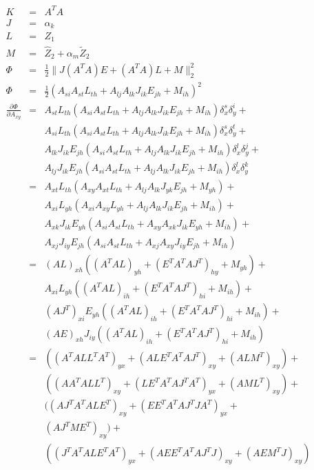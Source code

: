 \documentclass[9pt,twocolumn]{extarticle}
\begin{document}
\begin{eqnarray*}
  K &=& A^TA\\
  J &=& \alpha_k\\
  L &=& Z_1\\
  M &=& \hat{Z}_2+\alpha_m\tilde{Z}_2\\
  \Phi &=& \frac{1}{2}\| J(A^TA)E + (A^TA)L + M \|_2^2\\
  \Phi &=& \frac{1}{2}(A_{si}A_{st}L_{th}+A_{lj}A_{lk}J_{ik}E_{jh}+M_{ih})^2\\
  \frac{\partial{\Phi}}{\partial{A_{xy}}}
  &=&A_{st}L_{th}(A_{si}A_{st}L_{th}+A_{lj}A_{lk}J_{ik}E_{jh}+M_{ih})\delta_x^s\delta_y^i+\\
  &&A_{si}L_{th}(A_{si}A_{st}L_{th}+A_{lj}A_{lk}J_{ik}E_{jh}+M_{ih})\delta_x^s\delta_y^t+\\
  &&A_{lk}J_{ik}E_{jh}(A_{si}A_{st}L_{th}+A_{lj}A_{lk}J_{ik}E_{jh}+M_{ih})\delta_x^l\delta_y^j+\\
  &&A_{lj}J_{ik}E_{jh}(A_{si}A_{st}L_{th}+A_{lj}A_{lk}J_{ik}E_{jh}+M_{ih})\delta_x^l\delta_y^k\\
  &=&A_{xt}L_{th}(A_{xy}A_{xt}L_{th}+A_{lj}A_{lk}J_{yk}E_{jh}+M_{yh})+\\
  &&A_{xi}L_{yh}(A_{xi}A_{xy}L_{yh}+A_{lj}A_{lk}J_{ik}E_{jh}+M_{ih})+\\
  &&A_{xk}J_{ik}E_{yh}(A_{si}A_{st}L_{th}+A_{xy}A_{xk}J_{ik}E_{yh}+M_{ih})+\\
  &&A_{xj}J_{iy}E_{jh}(A_{si}A_{st}L_{th}+A_{xj}A_{xy}J_{iy}E_{jh}+M_{ih})\\
  &=&  (AL)_{xh}((A^TAL)_{yh}+(E^TA^TAJ^T)_{hy}+M_{yh})+\\
  &&A_{xi}L_{yh}((A^TAL)_{ih}+(E^TA^TAJ^T)_{hi}+M_{ih})+\\
  &&(AJ^T)_{xi}E_{yh}((A^TAL)_{ih}+(E^TA^TAJ^T)_{hi}+M_{ih})+\\
  &&(AE)_{xh}J_{iy}((A^TAL)_{ih}+(E^TA^TAJ^T)_{hi}+M_{ih})\\
  &=& ((A^TALL^TA^T)_{yx}+(ALE^TA^TAJ^T)_{xy}+(ALM^T)_{xy})+\\
  &&((AA^TALL^T)_{xy}+(LE^TA^TAJ^TA^T)_{yx}+(AML^T)_{xy})+\\
  &&((AJ^TA^TALE^T)_{xy}+(EE^TA^TAJ^TJA^T)_{yx}+\\
  &&(AJ^TME^T)_{xy})+\\
  &&((J^TA^TALE^TA^T)_{yx}+(AEE^TA^TAJ^TJ)_{xy}+(AEM^TJ)_{xy})
\end{eqnarray*}


\end{document}
